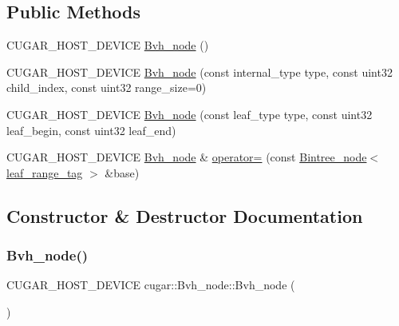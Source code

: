 \subsection*{Public Methods}
\begin{DoxyCompactItemize}
\item 
C\+U\+G\+A\+R\+\_\+\+H\+O\+S\+T\+\_\+\+D\+E\+V\+I\+CE \hyperlink{structcugar_1_1_bvh__node_a3005ccf86a59ef28755cccec0445bf5d}{Bvh\+\_\+node} ()
\item 
C\+U\+G\+A\+R\+\_\+\+H\+O\+S\+T\+\_\+\+D\+E\+V\+I\+CE \hyperlink{structcugar_1_1_bvh__node_a01156ead9915a2849bc042fa57508345}{Bvh\+\_\+node} (const internal\+\_\+type type, const uint32 child\+\_\+index, const uint32 range\+\_\+size=0)
\item 
C\+U\+G\+A\+R\+\_\+\+H\+O\+S\+T\+\_\+\+D\+E\+V\+I\+CE \hyperlink{structcugar_1_1_bvh__node_a0d997ffdc050ef2fd937a5805b3f06df}{Bvh\+\_\+node} (const leaf\+\_\+type type, const uint32 leaf\+\_\+begin, const uint32 leaf\+\_\+end)
\item 
C\+U\+G\+A\+R\+\_\+\+H\+O\+S\+T\+\_\+\+D\+E\+V\+I\+CE \hyperlink{structcugar_1_1_bvh__node}{Bvh\+\_\+node} \& \hyperlink{structcugar_1_1_bvh__node_ad368801b53b70ab0c54a810971a16968}{operator=} (const \hyperlink{structcugar_1_1_bintree__node}{Bintree\+\_\+node}$<$ \hyperlink{structcugar_1_1leaf__range__tag}{leaf\+\_\+range\+\_\+tag} $>$ \&base)
\end{DoxyCompactItemize}


\subsection{Constructor \& Destructor Documentation}
\mbox{\label{structcugar_1_1_bvh__node_a3005ccf86a59ef28755cccec0445bf5d}} 
\subsubsection{\texorpdfstring{Bvh\+\_\+node()}{Bvh\_node()}\hspace{0.1cm}{\footnotesize\ttfamily [1/3]}}
{\footnotesize\ttfamily C\+U\+G\+A\+R\+\_\+\+H\+O\+S\+T\+\_\+\+D\+E\+V\+I\+CE cugar\+::\+Bvh\+\_\+node\+::\+Bvh\+\_\+node (\begin{DoxyParamCaption}{ }\end{DoxyParamCaption})\hspace{0.3cm}{\ttfamily [inline]}}

